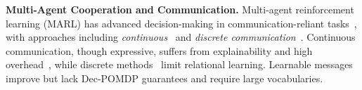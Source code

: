 









\textbf{Multi-Agent Cooperation and Communication.} Multi-agent reinforcement learning (MARL) has advanced decision-making in communication-reliant tasks~\cite{6303906}, with approaches including \textit{continuous}~\cite{dial,commnet,maddpg,atoc,wang2019learning,sarnet,chen2023real,chen2023distributional} and \textit{discrete communication}~\cite{emergentlan,freed2020sparse,lazaridou2020emergent,9812285,tucker2022trading,chen2024rgmcomm}. Continuous communication, though expressive, suffers from explainability and high overhead~\cite{chen2023ride}, while discrete methods~\cite{maddpg,commnet} limit relational learning. Learnable messages~\cite{tucker2021emergent} improve but lack Dec-POMDP guarantees and require large vocabularies.

